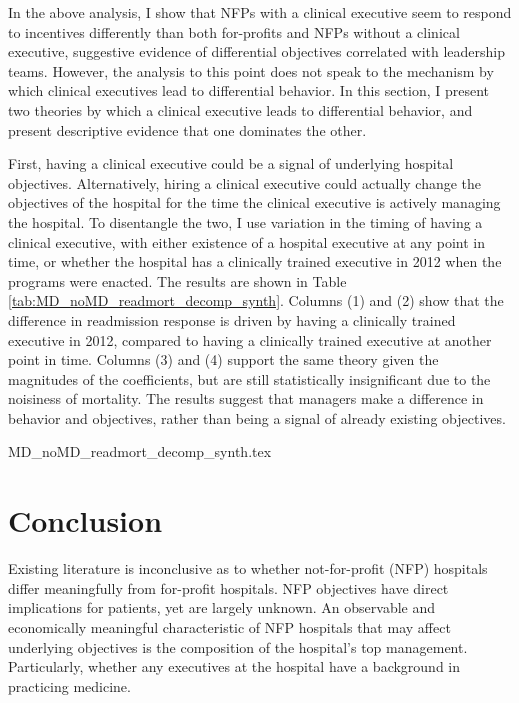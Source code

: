 \documentclass[12pt]{article}
\begin{document}
    In the above analysis, I show that NFPs with a clinical executive seem to respond to incentives differently than both for-profits and NFPs without a clinical executive, suggestive evidence of differential objectives correlated with leadership teams. However, the analysis to this point does not speak to the mechanism by which clinical executives lead to differential behavior. In this section, I present two theories by which a clinical executive leads to differential behavior, and present descriptive evidence that one dominates the other. 
    
    First, having a clinical executive could be a signal of underlying hospital objectives. Alternatively, hiring a clinical executive could actually change the objectives of the hospital for the time the clinical executive is actively managing the hospital. To disentangle the two, I use variation in the timing of having a clinical executive, with either existence of a hospital executive at any point in time, or whether the hospital has a clinically trained executive in 2012 when the programs were enacted. The results are shown in Table \ref{tab:MD_noMD_readmort_decomp_synth}. Columns (1) and (2) show that the difference in readmission response is driven by having a clinically trained executive in 2012, compared to having a clinically trained executive at another point in time. Columns (3) and (4) support the same theory given the magnitudes of the coefficients, but are still statistically insignificant due to the noisiness of mortality. The results suggest that managers make a difference in behavior and objectives, rather than being a signal of already existing objectives. 

    {MD_noMD_readmort_decomp_synth.tex}

     
 

    \section{Conclusion}

    Existing literature is inconclusive as to whether not-for-profit (NFP) hospitals differ meaningfully from for-profit hospitals. NFP objectives have direct implications for patients, yet are largely unknown. An observable and economically meaningful characteristic of NFP hospitals that may affect underlying objectives is the composition of the hospital's top management. Particularly, whether any executives at the hospital have a background in practicing medicine.
\end{document}
